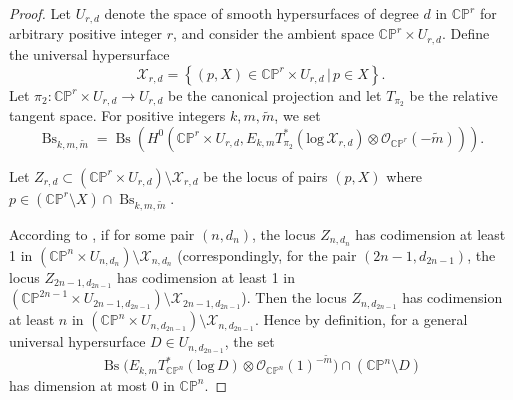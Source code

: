 \documentclass[english, 12pt]{amsart}
\DeclareMathOperator{\bs}{Bs}
\def\log{\mathrm{log}\,}
\theoremstyle{plain}
\theoremstyle{remark}
\numberwithin{equation}{section}
\theoremstyle{plain}
\theoremstyle{named}
\begin{document}
\begin{proof}
	Let $U_{r,d}$ denote the space of smooth hypersurfaces of degree $d$ in $\mathbb{C}\mathbb{P}^r$ for arbitrary positive integer $r$, and consider the ambient space $\mathbb{C}\mathbb{P}^r\times U_{r,d}$. Define the universal hypersurface $$\mathcal{X}_{r,d}=\left\{(p,X)\in\mathbb{C}\mathbb{P}^r\times U_{r,d}\, \big|\, p\in X\right\}.$$ 
	Let $\pi_2\colon \mathbb{C}\mathbb{P}^r\times U_{r,d}\to U_{r,d}$ be the canonical projection and let $T_{\pi_2}$ be the relative tangent space. For positive integers $k,m,\widetilde{m}$, we set
	\[\bs_{k,m,\widetilde{m}}=\bs\left(H^0\left(\mathbb{C}\mathbb{P}^r\times U_{r,d},E_{k,m}T_{\pi_2}^*\left(\log \mathcal{X}_{r,d}\right)\otimes\mathcal{O}_{\mathbb{C}\mathbb{P}^r}(-\widetilde{m})\right)\right).\]
	
	Let $Z_{r,d}\subset \left(\mathbb{C}\mathbb{P}^r\times U_{r,d}\right)\setminus\mathcal{X}_{r,d}$ be the locus of pairs $(p, X)$ where $p \in (\mathbb{C}\mathbb{P}^r\setminus X)\cap \bs_{k,m,\widetilde{m}}$.
	
	According to \cite[Theorem 3.6]{Riedl-Yang22}, if for some pair \( (n, d_{n}) \), the locus $Z_{n,d_{n}}$ has codimension at least 1 in $ \left(\mathbb{C}\mathbb{P}^{n}\times U_{n,d_{n}}\right)\setminus\mathcal{X}_{n,d_{n}}$ (correspondingly, for the pair \( (2n-1, d_{2n-1}) \), the locus $Z_{2n-1,d_{2n-1}}$ has codimension at least 1 in $ \left(\mathbb{C}\mathbb{P}^{2n-1}\times U_{2n-1,d_{2n-1}}\right)\setminus\mathcal{X}_{2n-1,d_{2n-1}}$). Then the locus $Z_{n,d_{2n-1}}$ has codimension at least $n$ in $\left(\mathbb{C}\mathbb{P}^{n}\times U_{n,d_{2n-1}}\right)\setminus\mathcal{X}_{n,d_{2n-1}}$. Hence by definition, for a general universal hypersurface $D\in U_{n,d_{2n-1}}$, the set 
	\[\bs	\big(
	E_{k,m}T_{\mathbb{C}\mathbb{P}^n}^*(\log D)
	\otimes
	\mathcal{O}_{\mathbb{C}\mathbb{P}^n}(1)^{-\widetilde{m}}
	\big)\cap \left(\mathbb{C}\mathbb{P}^n\setminus D\right)\]
	has dimension at most 0 in $\mathbb{C}\mathbb{P}^n$.
	

\end{proof}
\end{document}
